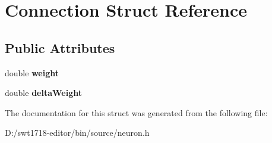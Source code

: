 \hypertarget{struct_connection}{}\section{Connection Struct Reference}
\label{struct_connection}
\subsection*{Public Attributes}
\begin{DoxyCompactItemize}
\item 
\mbox{\label{struct_connection_ab945ccb1a81e582abd5938f67af69390}} 
double {\bfseries weight}
\item 
\mbox{\label{struct_connection_a9f74bf311cc02e9f2e17ca28baf74fab}} 
double {\bfseries delta\+Weight}
\end{DoxyCompactItemize}


The documentation for this struct was generated from the following file\+:\begin{DoxyCompactItemize}
\item 
D\+:/swt1718-\/editor/bin/source/neuron.\+h\end{DoxyCompactItemize}
